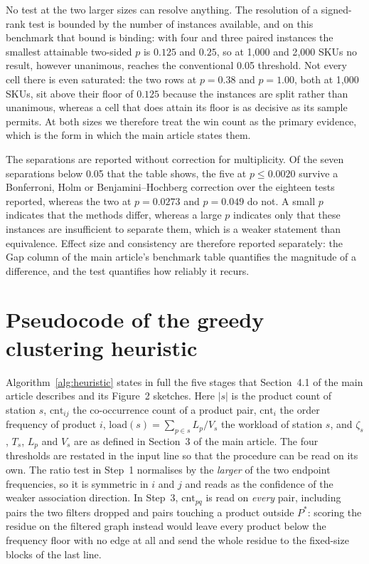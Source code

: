 \documentclass[11pt]{article}
\begin{document}
No test at the two larger sizes can resolve anything. The resolution of a signed-rank test is
bounded by the number of instances available, and on this benchmark that bound is binding: with
four and three paired instances the smallest attainable two-sided $p$ is $0.125$ and $0.25$, so
at 1{,}000 and 2{,}000 SKUs no result, however unanimous, reaches the conventional 0.05
threshold. Not every cell there is even saturated: the two rows at $p=0.38$ and $p=1.00$, both
at 1{,}000 SKUs, sit above their floor of $0.125$ because the instances are split rather than
unanimous, whereas a cell that does attain its floor is as decisive as its sample permits. At
both sizes we therefore treat the win count as the primary evidence, which is the form in which
the main article states them.

The separations are reported without correction for multiplicity. Of the seven separations
below 0.05 that the table shows, the five at $p \le 0.0020$ survive a Bonferroni, Holm or
Benjamini--Hochberg correction over the eighteen tests reported, whereas the two at
$p = 0.0273$ and $p = 0.049$ do not. A small $p$ indicates that the methods differ, whereas a
large $p$ indicates only that these instances are insufficient to separate them, which is a
weaker statement than equivalence. Effect size and consistency are therefore reported
separately: the Gap column of the main article's benchmark table quantifies the magnitude of a
difference, and the test quantifies how reliably it recurs.

\section{Pseudocode of the greedy clustering heuristic}\label{sup:heuristic}
Algorithm~\ref{alg:heuristic} states in full the five stages that Section~4.1 of the main
article describes and its Figure~2 sketches. Here $|s|$ is the product count of station $s$,
$\mathrm{cnt}_{ij}$ the co-occurrence count of a product pair, $\mathrm{cnt}_i$ the order
frequency of product $i$, $\mathrm{load}(s)=\sum_{p\in s}L_p/V_s$ the workload of station $s$,
and $\zeta_s$, $T_s$, $L_p$ and $V_s$ are as defined in Section~3 of the main article. The four
thresholds are restated in the input line so that the procedure can be read on its own. The
ratio test in Step~1 normalises by the \emph{larger} of the two endpoint frequencies, so it is
symmetric in $i$ and $j$ and reads as the confidence of the weaker association direction. In
Step~3, $\mathrm{cnt}_{pq}$ is read on \emph{every} pair, including pairs the two filters dropped
and pairs touching a product outside $P^{\ast}$: scoring the residue on the filtered graph instead
would leave every product below the frequency floor with no edge at all and send the whole residue
to the fixed-size blocks of the last line.
\end{document}
